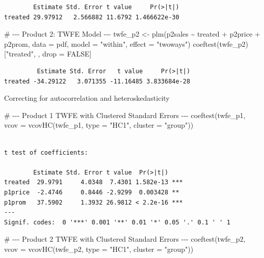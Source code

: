 \documentclass[
  letterpaper,
  DIV=11,
  numbers=noendperiod]{scrartcl}
\newenvironment{Shaded}{\begin{snugshade}}{\end{snugshade}}
\newcommand{\AttributeTok}[1]{\textcolor[rgb]{0.40,0.45,0.13}{#1}}
\newcommand{\CommentTok}[1]{\textcolor[rgb]{0.37,0.37,0.37}{#1}}
\newcommand{\ConstantTok}[1]{\textcolor[rgb]{0.56,0.35,0.01}{#1}}
\newcommand{\FunctionTok}[1]{\textcolor[rgb]{0.28,0.35,0.67}{#1}}
\newcommand{\NormalTok}[1]{\textcolor[rgb]{0.00,0.23,0.31}{#1}}
\newcommand{\OtherTok}[1]{\textcolor[rgb]{0.00,0.23,0.31}{#1}}
\newcommand{\SpecialCharTok}[1]{\textcolor[rgb]{0.37,0.37,0.37}{#1}}
\newcommand{\StringTok}[1]{\textcolor[rgb]{0.13,0.47,0.30}{#1}}
\begin{document}
\begin{verbatim}
        Estimate Std. Error t value     Pr(>|t|)
treated 29.97912   2.566882 11.6792 1.466622e-30
\end{verbatim}

\begin{Shaded}
\begin{Highlighting}[]
\CommentTok{\# {-}{-}{-} Product 2: TWFE Model {-}{-}{-}}
\NormalTok{twfe\_p2 }\OtherTok{\textless{}{-}} \FunctionTok{plm}\NormalTok{(p2sales }\SpecialCharTok{\textasciitilde{}}\NormalTok{ treated }\SpecialCharTok{+}\NormalTok{ p2price }\SpecialCharTok{+}\NormalTok{ p2prom,}
               \AttributeTok{data =}\NormalTok{ pdf,}
               \AttributeTok{model =} \StringTok{"within"}\NormalTok{,}
               \AttributeTok{effect =} \StringTok{"twoways"}\NormalTok{)}
\FunctionTok{coeftest}\NormalTok{(twfe\_p2)[}\StringTok{"treated"}\NormalTok{, , drop }\OtherTok{=} \ConstantTok{FALSE}\NormalTok{]}
\end{Highlighting}
\end{Shaded}

\begin{verbatim}
         Estimate Std. Error   t value     Pr(>|t|)
treated -34.29122   3.071355 -11.16485 3.833684e-28
\end{verbatim}

Correcting for autocorrelation and heteroskedasticity

\begin{Shaded}
\begin{Highlighting}[]
\CommentTok{\# {-}{-}{-} Product 1 TWFE with Clustered Standard Errors {-}{-}{-}}
\FunctionTok{coeftest}\NormalTok{(twfe\_p1, }\AttributeTok{vcov =} \FunctionTok{vcovHC}\NormalTok{(twfe\_p1, }\AttributeTok{type =} \StringTok{"HC1"}\NormalTok{, }\AttributeTok{cluster =} \StringTok{"group"}\NormalTok{))}
\end{Highlighting}
\end{Shaded}

\begin{verbatim}

t test of coefficients:

        Estimate Std. Error t value  Pr(>|t|)    
treated  29.9791     4.0348  7.4301 1.582e-13 ***
p1price  -2.4746     0.8446 -2.9299  0.003428 ** 
p1prom   37.5902     1.3932 26.9812 < 2.2e-16 ***
---
Signif. codes:  0 '***' 0.001 '**' 0.01 '*' 0.05 '.' 0.1 ' ' 1
\end{verbatim}

\begin{Shaded}
\begin{Highlighting}[]
\CommentTok{\# {-}{-}{-} Product 2 TWFE with Clustered Standard Errors {-}{-}{-}}
\FunctionTok{coeftest}\NormalTok{(twfe\_p2, }\AttributeTok{vcov =} \FunctionTok{vcovHC}\NormalTok{(twfe\_p2, }\AttributeTok{type =} \StringTok{"HC1"}\NormalTok{, }\AttributeTok{cluster =} \StringTok{"group"}\NormalTok{))}
\end{Highlighting}
\end{Shaded}
\end{document}
